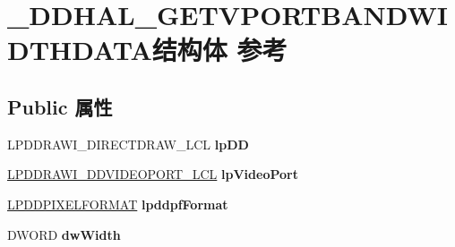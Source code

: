 \hypertarget{struct___d_d_h_a_l___g_e_t_v_p_o_r_t_b_a_n_d_w_i_d_t_h_d_a_t_a}{}\section{\+\_\+\+D\+D\+H\+A\+L\+\_\+\+G\+E\+T\+V\+P\+O\+R\+T\+B\+A\+N\+D\+W\+I\+D\+T\+H\+D\+A\+T\+A结构体 参考}
\label{struct___d_d_h_a_l___g_e_t_v_p_o_r_t_b_a_n_d_w_i_d_t_h_d_a_t_a}
\subsection*{Public 属性}
\begin{DoxyCompactItemize}
\item 
\mbox{\label{struct___d_d_h_a_l___g_e_t_v_p_o_r_t_b_a_n_d_w_i_d_t_h_d_a_t_a_a7c114dc86f976b99f0c7fe32b28e55ad}} 
L\+P\+D\+D\+R\+A\+W\+I\+\_\+\+D\+I\+R\+E\+C\+T\+D\+R\+A\+W\+\_\+\+L\+CL {\bfseries lp\+DD}
\item 
\mbox{\label{struct___d_d_h_a_l___g_e_t_v_p_o_r_t_b_a_n_d_w_i_d_t_h_d_a_t_a_aee536714c4d1dd4da0b215ff20976a2c}} 
\hyperlink{struct___d_d_r_a_w_i___d_d_v_i_d_e_o_p_o_r_t___l_c_l}{L\+P\+D\+D\+R\+A\+W\+I\+\_\+\+D\+D\+V\+I\+D\+E\+O\+P\+O\+R\+T\+\_\+\+L\+CL} {\bfseries lp\+Video\+Port}
\item 
\mbox{\label{struct___d_d_h_a_l___g_e_t_v_p_o_r_t_b_a_n_d_w_i_d_t_h_d_a_t_a_a01d0afb50c59b3e25dd13258c105baf4}} 
\hyperlink{interfacevoid}{L\+P\+D\+D\+P\+I\+X\+E\+L\+F\+O\+R\+M\+AT} {\bfseries lpddpf\+Format}
\item 
\mbox{\label{struct___d_d_h_a_l___g_e_t_v_p_o_r_t_b_a_n_d_w_i_d_t_h_d_a_t_a_acf62c8b569eb8e66a39551e8e3a0e011}} 
D\+W\+O\+RD {\bfseries dw\+Width}
\item 
\mbox{\label{struct___d_d_h_a_l___g_e_t_v_p_o_r_t_b_a_n_d_w_i_d_t_h_d_a_t_a_aa034427d90c9fc18e7e5adf4672d0078}} 

\end{DoxyCompactItemize}
